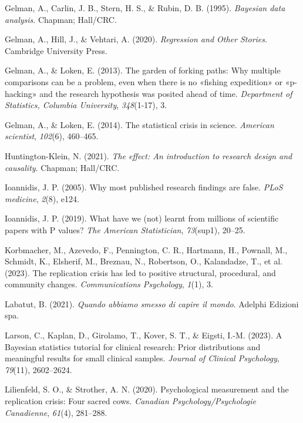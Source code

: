 \documentclass[
  letterpaper,
  DIV=11,
  numbers=noendperiod]{scrreprt}
\newlength{\cslhangindent}
\newenvironment{CSLReferences}[2] %
 {\begin{list}{}{%
  \setlength{\itemindent}{0pt}
  \setlength{\leftmargin}{0pt}
  \setlength{\parsep}{0pt}
  \ifodd #1
   \setlength{\leftmargin}{\cslhangindent}
   \setlength{\itemindent}{-1\cslhangindent}
  \fi
  \setlength{\itemsep}{#2\baselineskip}}}
 {\end{list}}
\theoremstyle{definition}
\theoremstyle{remark}
\begin{document}
\begin{CSLReferences}{1}{0}
Gelman, A., Carlin, J. B., Stern, H. S., \& Rubin, D. B. (1995).
\emph{Bayesian data analysis}. Chapman; Hall/CRC.

Gelman, A., Hill, J., \& Vehtari, A. (2020). \emph{Regression and Other
Stories}. Cambridge University Press.

Gelman, A., \& Loken, E. (2013). The garden of forking paths: Why
multiple comparisons can be a problem, even when there is no {«fishing
expedition»} or {«p-hacking»} and the research hypothesis was posited
ahead of time. \emph{Department of Statistics, Columbia University},
\emph{348}(1-17), 3.

Gelman, A., \& Loken, E. (2014). The statistical crisis in science.
\emph{American scientist}, \emph{102}(6), 460--465.

Huntington-Klein, N. (2021). \emph{The effect: An introduction to
research design and causality}. Chapman; Hall/CRC.

Ioannidis, J. P. (2005). Why most published research findings are false.
\emph{PLoS medicine}, \emph{2}(8), e124.

Ioannidis, J. P. (2019). What have we (not) learnt from millions of
scientific papers with P values? \emph{The American Statistician},
\emph{73}(sup1), 20--25.

Korbmacher, M., Azevedo, F., Pennington, C. R., Hartmann, H., Pownall,
M., Schmidt, K., Elsherif, M., Breznau, N., Robertson, O., Kalandadze,
T., et al. (2023). The replication crisis has led to positive
structural, procedural, and community changes. \emph{Communications
Psychology}, \emph{1}(1), 3.

Labatut, B. (2021). \emph{Quando abbiamo smesso di capire il mondo}.
Adelphi Edizioni spa.

Larson, C., Kaplan, D., Girolamo, T., Kover, S. T., \& Eigsti, I.-M.
(2023). A Bayesian statistics tutorial for clinical research: Prior
distributions and meaningful results for small clinical samples.
\emph{Journal of Clinical Psychology}, \emph{79}(11), 2602--2624.

Lilienfeld, S. O., \& Strother, A. N. (2020). Psychological measurement
and the replication crisis: Four sacred cows. \emph{Canadian
Psychology/Psychologie Canadienne}, \emph{61}(4), 281--288.


\end{CSLReferences}
\end{document}

